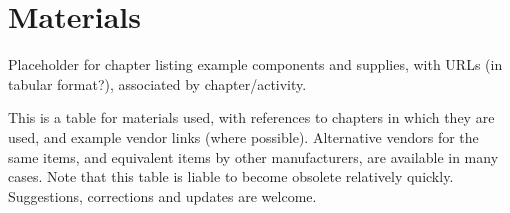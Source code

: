 \setchapterpreamble[u]{\margintoc}
\chapter{Materials}

Placeholder for chapter listing example components and supplies, with URLs (in tabular format?), associated by chapter/activity.

This is a table for materials used, with references to chapters in which they are used, and example vendor links (where possible). Alternative vendors for the same items, and equivalent items by other manufacturers, are available in many cases. Note that this table is liable to become obsolete relatively quickly. Suggestions, corrections and updates are welcome.

